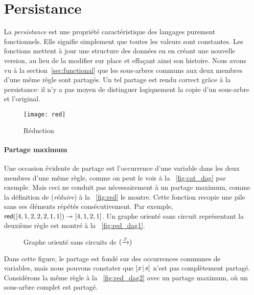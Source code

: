 \section{Persistance}
\label{sec:persistence}

La \emph{persistance} est une propriété
caractéristique des langages purement fonctionnels. Elle signifie
simplement que toutes les valeurs sont constantes. Les fonctions
mettent à jour une structure des données en en créant une nouvelle
version, au lieu de la modifier sur place et effaçant ainsi son
histoire. Nous avons vu à la section~\vref{sec:functional} que les
sous-arbres communs aux deux membres d'une même règle sont partagés.
Un tel partage est rendu correct grâce à la persistance: il n'y a pas
moyen de distinguer logiquement la copie d'un sous-arbre et
l'original.

%
\setlength{\intextsep}{0pt}
\begin{wrapfigure}[6]{r}[0pt]{0pt}
\centering
\texttt{[image: red]}
\caption{Réduction}
\label{fig:red}
\end{wrapfigure}

\paragraph{Partage maximum}

Une occasion évidente de partage est l'occurrence d'une variable dans
les deux membres d'une même règle, comme on peut le voir à la
\fig~\vref{fig:cat_dag} par exemple. Mais ceci ne conduit pas
nécessairement à un partage maximum, comme la définition de
 (\emph{réduire}) à la
\fig~\vref{fig:red} le montre. Cette fonction recopie une pile sans
ses éléments répétés consécutivement. Par exemple,
\(\textsf{red}([4,1,2,2,2,1,1]) \twoheadrightarrow [4,1,2,1]\). Un graphe
orienté sans circuit représentant la deuxième règle est montré à la
\fig~\vref{fig:red_dag1}.
\begin{figure}[b]
\centering
{}
\qquad\qquad
{}
\caption{Graphe orienté sans circuits de \((\xrightarrow{\smash{\beta}})\)}
\end{figure}
Dans cette figure, le partage est fondé sur des occurrences communes
de variables, mais nous pouvons constater que \([{x}\!\mid\!{s}]\) n'est
pas complètement partagé. Considérons la même règle à la
\fig~\vref{fig:red_dag2} avec un partage maximum, où un sous-arbre
complet est partagé.

